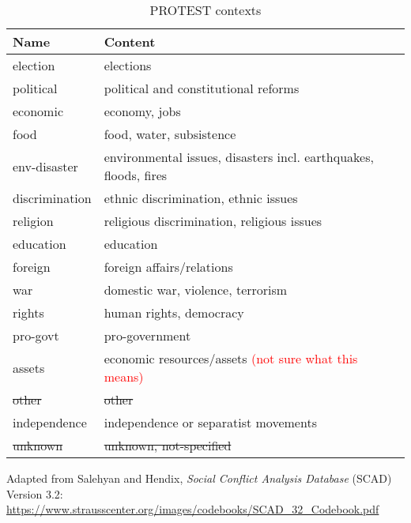 \documentclass[11pt]{report}
\newcommand{\andy}[1]{\textcolor{red}{#1}}
\begin{document}
\begin{table}[htp]
\caption{PROTEST contexts}
\begin{center}
\begin{tabular}{|l|l|}
\hline
Name & Content \\
\hline
election   &   elections\\
political   &   political and constitutional reforms\\
economic &   economy, jobs\\
food           &   food, water, subsistence\\
env-disaster            &   environmental issues, disasters incl. earthquakes, floods, fires\\
discrimination            &   ethnic discrimination, ethnic issues\\
religion           &   religious discrimination, religious issues\\
education            &   education\\
foreign            &   foreign affairs/relations\\
war            &   domestic war, violence, terrorism\\
rights             &   human rights, democracy\\
pro-govt             &   pro-government\\
assets             &   economic resources/assets \andy{(not sure what this means)}\\
\sout{other}             &   \sout{other} \\
independence & independence or separatist movements\\
\sout{unknown}             &   \sout{unknown, not-specified}\\	
\hline
\end{tabular}
\end{center}
\label{tab:protestcontext}
\raggedright{Adapted from Salehyan and Hendix, \textit{Social Conflict Analysis Database} (SCAD)
Version 3.2: \url{https://www.strausscenter.org/images/codebooks/SCAD\_32\_Codebook.pdf}}\\~
\end{table}

\clearpage

\end{document}

